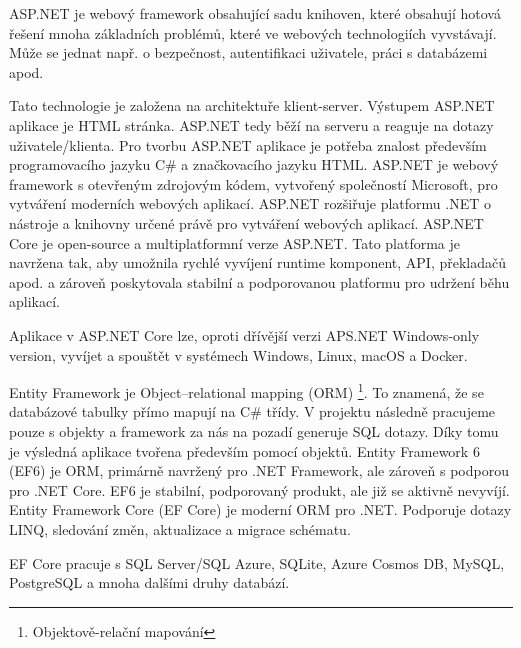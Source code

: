 \documentclass[a4paper, 12pt]{report}
\begin{document}
			ASP.NET je webový framework obsahující sadu knihoven, které obsahují hotová řešení mnoha základních problémů, které ve webových technologiích
            vyvstávají. Může se jednat např. o bezpečnost, autentifikaci uživatele, práci s databázemi apod.\par
			Tato technologie je založena na architektuře klient-server. Výstupem ASP.NET aplikace je HTML stránka. ASP.NET tedy běží na serveru a reaguje
            na dotazy uživatele/klienta. Pro tvorbu ASP.NET aplikace je potřeba znalost především programovacího jazyku C\# a značkovacího jazyku
            HTML.\cite{ASP.NET_Lekce1}
            ASP.NET je webový framework s otevřeným zdrojovým kódem, vytvořený společností Microsoft, pro vytváření moderních webových aplikací. ASP.NET
            rozšiřuje platformu .NET o nástroje a knihovny určené právě pro vytváření webových aplikací.\cite{ASP.NET}
            ASP.NET Core je open-source a multiplatformní verze ASP.NET. Tato platforma je navržena tak, aby umožnila rychlé vyvíjení runtime komponent,
            API, překladačů apod. a zároveň poskytovala stabilní a podporovanou platformu pro udržení běhu aplikací.\par
            Aplikace v ASP.NET Core lze, oproti dřívější verzi APS.NET Windows-only version, vyvíjet a spouštět v systémech Windows, Linux, macOS
            a Docker.\cite{ASP.NET_Core}

        Entity Framework je Object–relational mapping (ORM) \footnote{Objektově-relační mapování}. To znamená, že se databázové tabulky přímo mapují
        na C\# třídy. V projektu následně pracujeme pouze s objekty a framework za nás na pozadí generuje SQL dotazy. Díky tomu je výsledná aplikace
        tvořena především pomocí objektů.\cite{ASP.NET_Lekce8}
            Entity Framework 6 (EF6) je ORM, primárně navržený pro .NET Framework, ale zároveň s podporou pro .NET Core. EF6 je stabilní, podporovaný
            produkt, ale již se aktivně nevyvíjí.\cite{EF6_EFCore}
				Entity Framework Core (EF Core) je moderní ORM pro .NET. Podporuje dotazy LINQ, sledování změn, aktualizace a migrace schématu.\par
				EF Core pracuje s SQL Server/SQL Azure, SQLite, Azure Cosmos DB, MySQL, PostgreSQL a mnoha dalšími druhy databází.\cite{EF6_EFCore}
\end{document}
